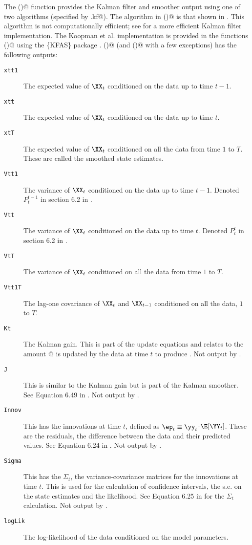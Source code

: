 The \verb@MARSSkf()@ function provides the Kalman filter and smoother output using one of two algorithms (specified by \verb@fun.kf@).  The algorithm in 
\verb@MARSSkfss()@ is that shown in \citet{ShumwayStoffer2006}.  This algorithm is not computationally efficient; see \citet[sec. 4.3]{Koopmanetal1998} for a more efficient Kalman filter implementation. The Koopman et al. implementation is provided in the functions \verb@MARSSkfas()@ using the \{KFAS\} package \citep{Helske2017}.  \verb@MARSSkfss()@ (and \verb@MARSSkfas()@ with a few exceptions) has the following outputs:
\begin{description}
\item[\texttt{xtt1 }] The expected value of $\XX_t$ conditioned on the data up to time $t-1$.
\item[\texttt{xtt  }] The expected value of $\XX_t$ conditioned on the data up to time $t$.
\item[\texttt{xtT  }] The expected value of $\XX_t$ conditioned on all the data from time $1$ to $T$.  These are called the smoothed state estimates.
\item[\texttt{Vtt1 }] The variance of $\XX_t$ conditioned on the data up to time $t-1$.  Denoted $P_t^{t-1}$ in section 6.2 in \citet{ShumwayStoffer2006}.
\item[\texttt{Vtt  }] The variance of $\XX_t$ conditioned on the data up to time $t$. Denoted $P_t^t$ in section 6.2 in \citet{ShumwayStoffer2006}.
\item[\texttt{VtT  }] The variance of $\XX_t$ conditioned on all the data from time $1$ to $T$.
\item[\texttt{Vtt1T}] The lag-one covariance of $\XX_t$ and $\XX_{t-1}$ conditioned on all the data, $1$ to $T$.
\item[\texttt{Kt   }] The Kalman gain.  This is part of the update equations and relates to the amount @ is updated by the data at time $t$ to produce \verb@xtt@.    Not  output by \verb@MARSSkfas@.
\item[\texttt{J    }] This is similar to the Kalman gain but is part of the Kalman smoother.  See Equation 6.49 in \citet{ShumwayStoffer2006}.     Not  output by \verb@MARSSkfas@.
\item[\texttt{Innov}] This has the innovations at time $t$, defined as $\ep_t \equiv \yy_t$-$\E[\YY_t]$.  These are the residuals, the difference between the data and their predicted values.  See Equation 6.24 in \citet{ShumwayStoffer2006}. Not  output by \verb@MARSSkfas@.
\item[\texttt{Sigma}] This has the $\Sigma_t$, the variance-covariance matrices for the innovations at time $t$.  This is used for the calculation of confidence intervals, the s.e. on the state estimates and the likelihood.  See Equation 6.25 in \citet{ShumwayStoffer2006} for the $\Sigma_t$ calculation.  Not  output by \verb@MARSSkfas@.
\item[\texttt{logLik}] The log-likelihood of the data conditioned on the model parameters.  
\end{description}

